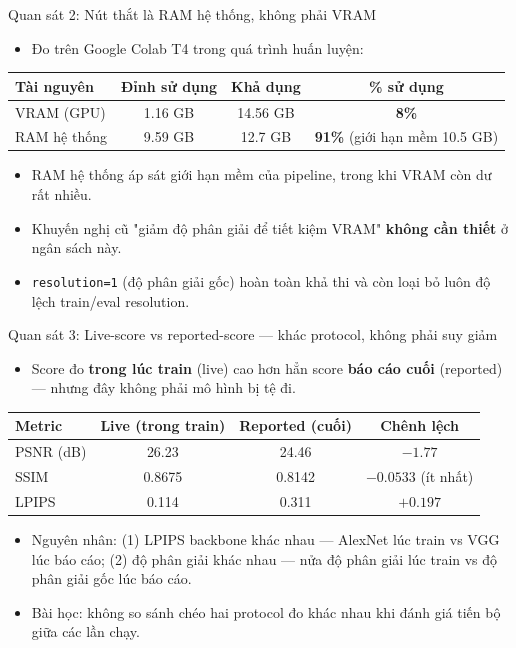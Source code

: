 \begin{frame}{Quan sát 2: Nút thắt là RAM hệ thống, không phải VRAM}
\begin{itemize}
    \item Đo trên Google Colab T4 trong quá trình huấn luyện:
\end{itemize}
\footnotesize
\begin{table}[]
\centering
\begin{tabular}{lccc}
\toprule
Tài nguyên & Đỉnh sử dụng & Khả dụng & \% sử dụng \\
\midrule
VRAM (GPU) & 1.16 GB & 14.56 GB & \textbf{8\%} \\
RAM hệ thống & 9.59 GB & 12.7 GB & \textbf{91\%} (giới hạn mềm 10.5 GB) \\
\bottomrule
\end{tabular}
\end{table}
\normalsize
\begin{itemize}
    \item RAM hệ thống áp sát giới hạn mềm của pipeline, trong khi VRAM còn dư rất nhiều.
    \item Khuyến nghị cũ "giảm độ phân giải để tiết kiệm VRAM" \textbf{không cần thiết} ở ngân sách này.
    \item \texttt{resolution=1} (độ phân giải gốc) hoàn toàn khả thi và còn loại bỏ luôn độ lệch train/eval resolution.
\end{itemize}
\end{frame}

\begin{frame}{Quan sát 3: Live-score vs reported-score — khác protocol, không phải suy giảm}
\begin{itemize}
    \item Score đo \textbf{trong lúc train} (live) cao hơn hẳn score \textbf{báo cáo cuối} (reported) — nhưng đây không phải mô hình bị tệ đi.
\end{itemize}
\footnotesize
\begin{table}[]
\centering
\begin{tabular}{lccc}
\toprule
Metric & Live (trong train) & Reported (cuối) & Chênh lệch \\
\midrule
PSNR (dB) & 26.23 & 24.46 & $-1.77$ \\
SSIM & 0.8675 & 0.8142 & $-0.0533$ (ít nhất) \\
LPIPS & 0.114 & 0.311 & $+0.197$ \\
\bottomrule
\end{tabular}
\end{table}
\normalsize
\begin{itemize}
    \item Nguyên nhân: (1) LPIPS backbone khác nhau — AlexNet lúc train vs VGG lúc báo cáo; (2) độ phân giải khác nhau — nửa độ phân giải lúc train vs độ phân giải gốc lúc báo cáo.
    \item \alert{Bài học:} không so sánh chéo hai protocol đo khác nhau khi đánh giá tiến bộ giữa các lần chạy.
\end{itemize}
\end{frame}

